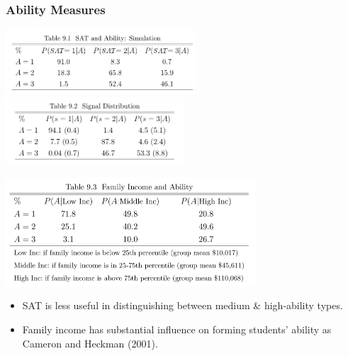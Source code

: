 \documentclass[10pt]{beamer}
\begin{document}
\begin{frame}[c]\frametitle{Ability Measures}

\centerline{\includegraphics[width=0.53\textwidth]{table91.png}\includegraphics[width=0.5\textwidth]{table92.png}}
\centerline{\includegraphics[width=0.7\textwidth]{table93.png}}
\begin{itemize}
    \small
    \item  SAT is less useful in distinguishing between medium \& high-ability types.
    \item  Family income has substantial influence on forming students' ability as Cameron and Heckman (2001).
\end{itemize}
\end{frame}
\end{document}
